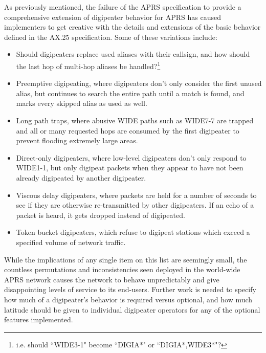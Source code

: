As previously mentioned, the failure of the APRS specification to provide
a comprehensive extension of digipeater behavior for APRS has caused
implementers to get creative with the details and extensions of
the basic behavior defined in the AX.25 specification.
Some of these variations include:
\begin{itemize}
	\item Should digipeaters replace used aliases with their callsign, and
		how should the last hop of multi-hop aliases be handled?\footnote{i.e.
		should ``WIDE3-1" become ``DIGIA*" or ``DIGIA*,WIDE3*"?}
	\item Preemptive digipeating, where digipeaters don't only consider the
		first unused alias, but continues to search the entire path
		until a match is found, and marks every skipped alias as used as well.
	\item Long path traps, where abusive WIDE paths such as WIDE7-7 are trapped
		and all or many requested hops are consumed by the first digipeater
		to prevent flooding extremely large areas.
	\item Direct-only digipeaters, where low-level digipeaters don't only respond
		to WIDE1-1, but only digipeat packets when they appear to have not
		been already digipeated by another digipeater.
	\item Viscous delay digipeaters, where packets are held for a number of
		seconds to see if they are otherwise re-transmitted by other digipeaters.
		If an echo of a packet is heard, it gets dropped instead of digipeated.
	\item Token bucket digipeaters, which refuse to digipeat stations which
		exceed a specified volume of network traffic.
\end{itemize}

While the implications of any single item on this list are seemingly small,
the countless permutations and inconsistencies seen deployed in the
world-wide APRS network causes the network to behave unpredictably and
give disappointing levels of service to its end-users.
Further work is needed to specify how much of a digipeater's behavior is
required versus optional, and how much latitude should be given to individual
digipeater operators for any of the optional features implemented.

